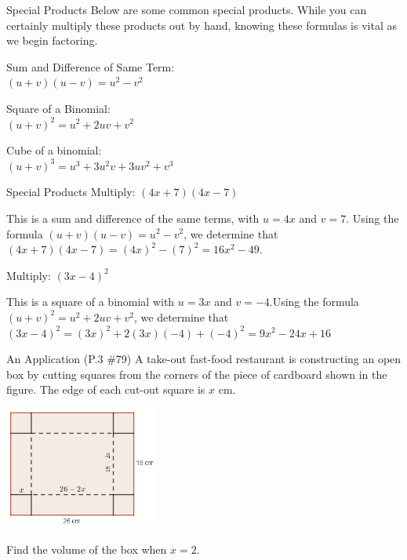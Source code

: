 \documentclass{beamer}
\begin{document}
\begin{frame}[t]{Special Products}
Below are some common special products. While you can certainly multiply these products out by hand, knowing these formulas is vital as we begin factoring. \vspace{8pt}

\pause 

Sum and Difference of Same Term: \\ $(u+v)(u-v) = u^2 - v^2$ \vspace{8pt}

\pause

Square of a Binomial: \\ $(u + v)^2 = u^2 + 2uv + v^2$ \vspace{8pt}

\pause

Cube of a binomial: \\ $(u + v)^3 = u^3 + 3u^2v + 3uv^2 + v^3$
\end{frame}

\begin{frame}[t]{Special Products}
Multiply: $(4x + 7)(4x - 7)$

\pause

This is a sum and difference of the same terms, with $u = 4x$ and $v = 7$. \pause Using the formula $(u + v)(u-v) = u^2 - v^2$, we determine that $(4x + 7)(4x - 7) = (4x)^2 - (7)^2$\pause$= 16x^2 - 49$. \vspace{12pt}

\pause

Multiply: $(3x - 4)^2$

\pause

This is a square of a binomial with $u = 3x$ and $v = -4$.\pause Using the formula $(u + v)^2 = u^2 + 2uv + v^2$, we determine that $(3x - 4)^2 = (3x)^2 + 2(3x)(-4) + (-4)^2$\pause$= 9x^2 - 24x + 16$
\end{frame}

\begin{frame}[t]{An Application}
(P.3 \#79) A take-out fast-food restaurant is constructing an open box by cutting squares from the corners of the piece of cardboard shown in the figure. The edge of each cut-out square is $x$ cm.

\includegraphics[width=2in]{TakeOutBox.png}

Find the volume of the box when $x = 2$.
\end{frame}
\end{document}
